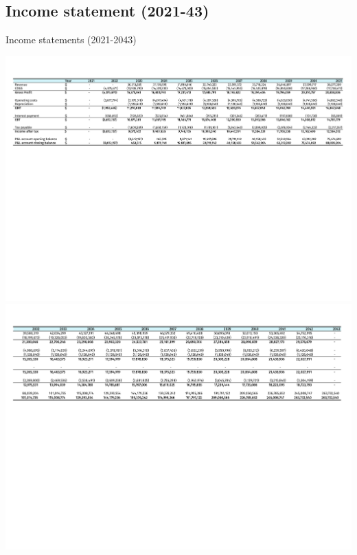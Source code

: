  
 \newpage
 \begin{landscape}
 \subsection{Income statement (2021-43)}
 \label{sec:income-statement}
\begin{table}[H]
\label{tab:Income}
  \caption{Income statements (2021-2043)}
\includegraphics[clip, trim=0cm 12cm 0cm 1cm, width=\linewidth]{chapters/Z-support/attachments/Income1.pdf}\\

\includegraphics[clip, trim=0cm 12cm 0cm 1cm, width=\linewidth]{chapters/Z-support/attachments/Income2.pdf}
\end{table}
 \end{landscape}


